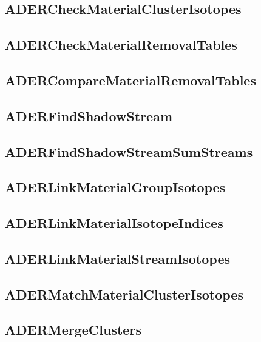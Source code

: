 \subsection{ADERCheckMaterialClusterIsotopes}


\subsection{ADERCheckMaterialRemovalTables}


\subsection{ADERCompareMaterialRemovalTables}


\subsection{ADERFindShadowStream}


\subsection{ADERFindShadowStreamSumStreams}


\subsection{ADERLinkMaterialGroupIsotopes}


\subsection{ADERLinkMaterialIsotopeIndices}


\subsection{ADERLinkMaterialStreamIsotopes}


\subsection{ADERMatchMaterialClusterIsotopes}


\subsection{ADERMergeClusters}


